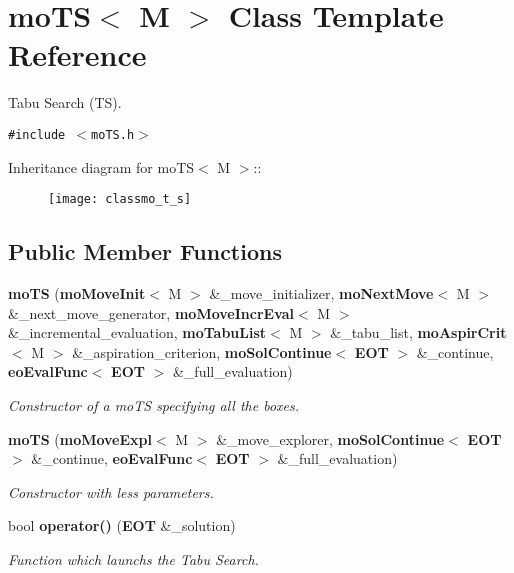 \section{mo\-TS$<$ M $>$ Class Template Reference}
\label{classmo_t_s}
Tabu Search (TS).  


{\tt \#include $<$mo\-TS.h$>$}

Inheritance diagram for mo\-TS$<$ M $>$::\begin{figure}[H]
\begin{center}
\leavevmode
\texttt{[image: classmo\_t\_s]}
\end{center}
\end{figure}
\subsection*{Public Member Functions}
\begin{CompactItemize}
\item 
{\bf mo\-TS} ({\bf mo\-Move\-Init}$<$ M $>$ \&\_\-move\_\-initializer, {\bf mo\-Next\-Move}$<$ M $>$ \&\_\-next\_\-move\_\-generator, {\bf mo\-Move\-Incr\-Eval}$<$ M $>$ \&\_\-incremental\_\-evaluation, {\bf mo\-Tabu\-List}$<$ M $>$ \&\_\-tabu\_\-list, {\bf mo\-Aspir\-Crit}$<$ M $>$ \&\_\-aspiration\_\-criterion, {\bf mo\-Sol\-Continue}$<$ {\bf EOT} $>$ \&\_\-continue, {\bf eo\-Eval\-Func}$<$ {\bf EOT} $>$ \&\_\-full\_\-evaluation)
\begin{CompactList}\small\item\em Constructor of a mo\-TS specifying all the boxes. \item\end{CompactList}\item 
{\bf mo\-TS} ({\bf mo\-Move\-Expl}$<$ M $>$ \&\_\-move\_\-explorer, {\bf mo\-Sol\-Continue}$<$ {\bf EOT} $>$ \&\_\-continue, {\bf eo\-Eval\-Func}$<$ {\bf EOT} $>$ \&\_\-full\_\-evaluation)
\begin{CompactList}\small\item\em Constructor with less parameters. \item\end{CompactList}\item 
bool {\bf operator()} ({\bf EOT} \&\_\-solution)
\begin{CompactList}\small\item\em Function which launchs the Tabu Search. \item\end{CompactList}\end{CompactItemize}
